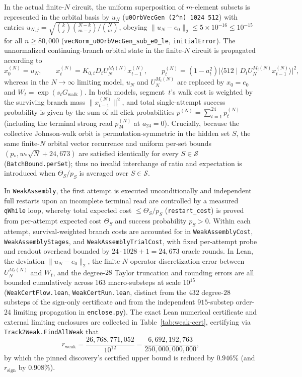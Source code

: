 \documentclass[11pt,a4paper]{article}
\theoremstyle{definition}
\theoremstyle{remark}
\begin{document}
In the actual finite-\(N\) circuit, the uniform superposition of \(m\)-element subsets is represented in the orbital basis by \(u_N\) (\texttt{u0OrbVecGen (2\^{}n) 1024 512}) with entries \(u_{N,j} = \sqrt{\binom{k}{j}\binom{N-k}{m-j}/\binom{N}{m}}\), obeying \(\|u_N - e_0\|_2 \le 5 \times 10^{-16} \le 10^{-15}\) for all \(n \ge 80{,}000\) (\texttt{vecNorm\_u0OrbVecGen\_sub\_e0\_le}, \texttt{initialError}). The unnormalized continuing-branch orbital state in the finite-\(N\) circuit is propagated according to
\[
  x_0^{(N)} = u_N, \qquad
  x_t^{(N)} = K_{0,t} D_t U_N^{M_t(N)} x_{t-1}^{(N)}, \qquad
  p_t^{(N)} = (1 - a_t^2)\bigl|\langle 512 \mid D_t U_N^{M_t(N)} x_{t-1}^{(N)}\rangle\bigr|^2,
\]
whereas in the \(N \to \infty\) limiting model, \(u_N\) and \(U_N^{M_t(N)}\) are replaced by \(x_0 = e_0\) and \(W_t = \exp(s_t G_{\mathrm{walk}})\). In both models, segment~\(t\)'s walk cost is weighted by the surviving branch mass \(\|x_{t-1}^{(N)}\|^2\), and total single-attempt success probability is given by the sum of all click probabilities \(p^{(N)} = \sum_{t=1}^{24} p_t^{(N)}\) (including the terminal strong read \(p_{24}^{(N)}\) at \(a_{24} = 0\)). Crucially, because the collective Johnson-walk orbit is permutation-symmetric in the hidden set \(S\), the same finite-\(N\) orbital vector recurrence and uniform per-set bounds \((p_*, w_*\sqrt{N} + 24{,}673)\) are satisfied identically for every \(S \in \mathcal{S}\) (\texttt{BatchBound.perSet}); thus no invalid interchange of ratio and expectation is introduced when \(\Theta_S / p_S\) is averaged over \(S \in \mathcal{S}\).

In \texttt{Weak\allowbreak Assembly}, the first attempt is executed unconditionally and independent full restarts upon an incomplete terminal read are controlled by a measured \texttt{qWhile} loop, whereby total expected cost \(\le \Theta_S / p_S\) (\texttt{restart\_cost}) is proved from per-attempt expected cost \(\Theta_S\) and success probability \(p_S > 0\). Within each attempt, survival-weighted branch costs are accounted for in \texttt{Weak\allowbreak Assembly\allowbreak Cost}, \texttt{Weak\allowbreak Assembly\allowbreak Stages}, and \texttt{Weak\allowbreak Assembly\allowbreak TrialCost}, with fixed per-attempt probe and readout overhead bounded by \(24 \cdot 1028 + 1 = 24{,}673\) oracle rounds. In Lean, the deviation \(\|u_N - e_0\|_2\), the finite-\(N\) operator discretization error between \(U_N^{M_t(N)}\) and \(W_t\), and the degree-\(28\) Taylor truncation and rounding errors are all bounded cumulatively across \(163\) macro-substeps at scale \(10^{15}\) (\texttt{WeakCertFlow.lean}, \texttt{WeakCertRun.lean}, distinct from the \(432\) degree-\(28\) substeps of the sign-only certificate and from the independent \(915\)-substep order-\(24\) limiting propagation in \texttt{enclose.py}). The exact Lean numerical certificate and external limiting enclosures are collected in Table~\ref{tab:weak-cert}, certifying via \texttt{Track2Weak.\allowbreak FindAllWeak} that
\[
  r_{\mathrm{weak}} = \frac{26{,}768{,}771{,}052}{10^{12}} = \frac{6{,}692{,}192{,}763}{250{,}000{,}000{,}000},
\]
by which the pinned discovery's certified upper bound is reduced by \(0.946\%\) (and \(r_{\mathrm{sign}}\) by \(0.908\%\)).
\end{document}
